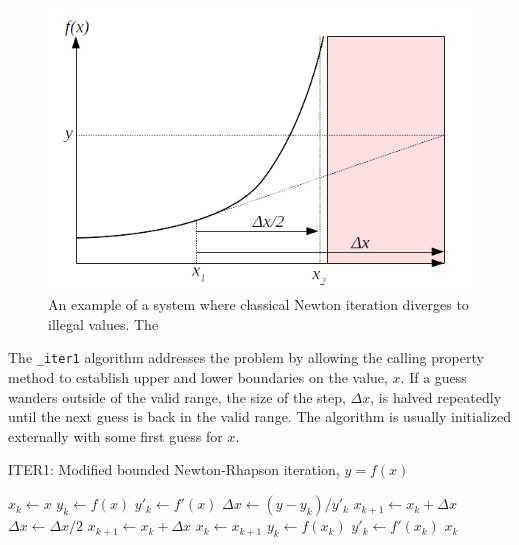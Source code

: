 \begin{figure}
\centering
\includegraphics[width=0.97\linewidth]{figures/iter1}
\caption{An example of a system where classical Newton iteration diverges to illegal values.  The }\label{fig:iter1}
\end{figure}

The \verb|_iter1| algorithm addresses the problem by allowing the calling property method to establish upper and lower boundaries on the value, $x$.  If a guess wanders outside of the valid range, the size of the step, $\Delta x$, is halved repeatedly until the next guess is back in the valid range.  The algorithm is usually initialized externally with some first guess for $x$.

\begin{algorithm}
\caption{ITER1: Modified bounded Newton-Rhapson iteration, $y = f(x)$}\label{alg:iter1}
\begin{algorithmic}
\State $x_k \gets x$ 
\State $y_k \gets f(x)$ 
\State $y'_k \gets f'(x)$
 
\State $\Delta x \gets (y - y_k)/y'_k$ 
\State $x_{k+1} \gets x_k + \Delta x$ 
\State {}
\State $\Delta x \gets \Delta x / 2$ 
\State $x_{k+1} \gets x_k + \Delta x$ 
\EndWhile
\State $x_{k} \gets x_{k+1}$ 
\State $y_k \gets f(x_k)$ 
\State $y'_k \gets f'(x_k)$
\EndWhile
\State \Return $x_k$
\EndProcedure
\end{algorithmic}
\end{algorithm}

